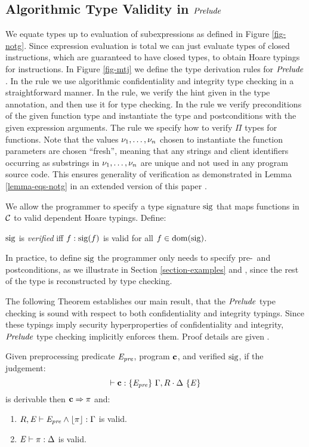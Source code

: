 \subsection{Algorithmic Type Validity in $\mathit{Prelude}$}

\mtjfig

We equate types up to evaluation of subexpressions as defined in
Figure \ref{fig-notg}. Since expression evaluation is total we can
just evaluate types of closed instructions, which are guaranteed to
have closed types, to obtain Hoare typings for instructions. In Figure
\ref{fig-mtj} we define the type derivation rules for $\mathit{Prelude}$. In
the  rule we use algorithmic confidentiality and
integrity type checking in a straightforward manner.  In the
 rule, we verify the hint given in the type
annotation, and then use it for type checking.  In the 
rule we verify preconditions of the given function type and
instantiate the type and postconditions with the given expression
arguments.  The  rule we specify how to verify $\Pi$
types for functions. Note that the values $\nu_1,\ldots,\nu_n$ chosen
to instantiate the function parameters are chosen ``fresh'', meaning
that any strings and client identifiers occurring as substrings in
$\nu_1,\ldots,\nu_n$ are unique and not used in any program source
code. This ensures generality of verification as demonstrated in Lemma
\ref{lemma-eqs-notg} in an extended version of this paper \cite{skalka2025smtboostedsecuritytypeslowlevel}.

\mtjfnfig

We allow the programmer to specify a type signature $\mathrm{sig}$ that
maps functions in $\mathcal{C}$ to valid dependent Hoare
typings. Define:
\begin{definition}
  $\mathrm{sig}$ is \emph{verified} iff $f : \mathrm{sig}(f)$ is valid for all $f \in \mathrm{dom}(\mathrm{sig})$.
\end{definition}
In practice, to define $\mathrm{sig}$ the programmer only needs to specify
pre-~and postconditions, as we illustrate in Section
\ref{section-examples} and \cite{skalka2025smtboostedsecuritytypeslowlevel},
since the rest of the type is reconstructed by type checking.

The following Theorem establishes our main result, that the
$\mathit{Prelude}$ type checking is sound with respect to both
confidentiality and integrity typings. Since these typings imply
security hyperproperties of confidentiality and integrity, $\mathit{Prelude}$
type checking implicitly enforces them. Proof details are given \cite{skalka2025smtboostedsecuritytypeslowlevel}.
\begin{theorem}
  \label{theorem-mtj}
  Given preprocessing predicate $\mathit{E}_{\mathit{pre}}$, program $\mathbf{c}$, and verified $\mathrm{sig}$, if
  the judgement: $$\vdash \mathbf{c} : \{ \mathit{E}_{\mathit{pre}} \}\ \Gamma,R \cdot \Delta\ \{ \mathit{E} \}$$ is derivable then
  $\mathbf{c} \Rightarrow \pi$ and:
  \begin{enumerate}
  \item $R,\mathit{E} \vdash \mathit{E}_{\mathit{pre}} \wedge \lfloor \pi \rfloor : \Gamma$ is valid.
  \item $\mathit{E} \vdash \pi : \Delta$ is valid.
  \end{enumerate}
\end{theorem}

